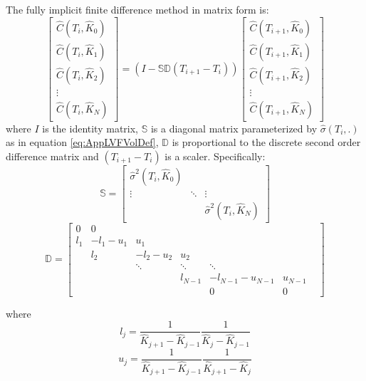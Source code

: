 \documentclass[letterpaper,12pt,titlepage,oneside,final]{book}
\numberwithin{equation}{section}
\theoremstyle{definition}
\begin{document}
 
 The fully implicit finite difference method in matrix form is:
 \begin{equation}
	 \begin{bmatrix}
 \widehat{C}(T_{i},\widehat{K}_0)\\
 \widehat{C}(T_{i},\widehat{K}_1)\\
 \widehat{C}(T_{i},\widehat{K}_2)\\
 \vdots\\
 \widehat{C}(T_{i},\widehat{K}_{N})
 \end{bmatrix}=(I-\mathcal{\mathbb{S}}\mathcal{\mathbb{D}}(T_{i+1}-T_i))
 \begin{bmatrix}
 \widehat{C}(T_{i+1},\widehat{K}_0)\\
 \widehat{C}(T_{i+1},\widehat{K}_1)\\
 \widehat{C}(T_{i+1},\widehat{K}_2)\\
 \vdots\\
 \widehat{C}(T_{i+1},\widehat{K}_{N})
 \end{bmatrix}
 \label{eq:AppLVFInt}
 \end{equation}
 where 
 $I$ is the identity matrix, $\mathcal{\mathbb{S}}$ is a diagonal matrix parameterized by $\widehat{\sigma}(T_i,.)$ as in equation \eqref{eq:AppLVFVolDef},  $\mathcal{\mathbb{D}}$ is proportional to the discrete second order difference matrix and $(T_{i+1}-T_i)$ is a scaler. Specifically:
		 \begin{equation}
			 \mathcal{\mathbb{S}}=	\begin{bmatrix}
				 \widehat{\sigma}^2(T_i,\widehat{K}_{0})&&\\
				 \vdots&\ddots&\vdots\\
				 &&\widehat{\sigma}^2(T_i,\widehat{K}_{N})
		 \end{bmatrix}
		 \label{eq:AppLVFMatrixS}
		 \end{equation}
		 \begin{equation}
			 \mathcal{\mathbb{D}}=\begin{bmatrix}
		 0&0&&&&\\
		 l_1&-l_1-u_1&u_1&&&\\
		 &l_2&-l_2-u_2&u_2&&&\\
		 &&\ddots&\ddots&\ddots&&\\
		 &&&l_{N-1}&-l_{N-1}-u_{N-1}&u_{N-1}\\
		 &&&&0&0
		 \end{bmatrix}
		 \label{eq:AppLVFMatrixD}
		 \end{equation}
 
		 where 
		 \[l_j=\frac{1}{\widehat{K}_{j+1}-\widehat{K}_{j-1}}\frac{1}{\widehat{K}_{j}-\widehat{K}_{j-1}}\]
		 \[u_j=\frac{1}{\widehat{K}_{j+1}-\widehat{K}_{j-1}}\frac{1}{\widehat{K}_{j+1}-\widehat{K}_{j}}\]
 
\end{document}
